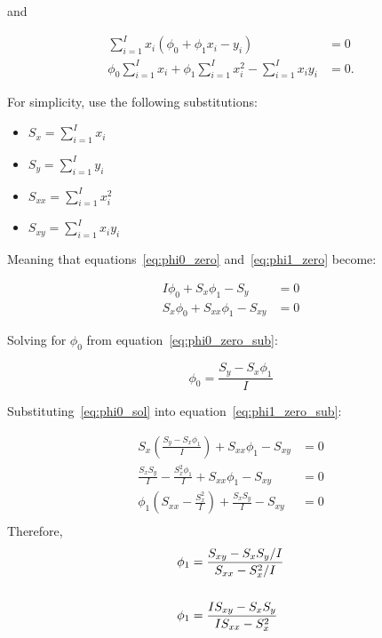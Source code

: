 \documentclass[12pt]{report}
\begin{document}
and

\begin{align}
    \sum_{i=1}^{I}x_{i}(\phi_{0} + \phi_{1}x_{i} - y_{i})                                    & = 0  \\
    \phi_{0}\sum_{i=1}^{I}x_{i} + \phi_{1}\sum_{i=1}^{I}x_{i}^{2} - \sum_{i=1}^{I}x_{i}y_{i} & = 0.
    \label{eq:phi1_zero}
\end{align}

For simplicity, use the following substitutions:

\begin{itemize}
    \item $S_{x} = \sum_{i=1}^{I}x_{i}$
    \item $S_{y} = \sum_{i=1}^{I}y_{i}$
    \item $S_{xx} = \sum_{i=1}^{I}x_{i}^{2}$
    \item $S_{xy} = \sum_{i=1}^{I}x_{i}y_{i}$
\end{itemize}

Meaning that equations~\eqref{eq:phi0_zero} and~\eqref{eq:phi1_zero} become:

\begin{align}
    I\phi_{0} + S_{x}\phi_{1} - S_{y}       & = 0
    \label{eq:phi0_zero_sub}                      \\
    S_{x}\phi_{0} + S_{xx}\phi_{1} - S_{xy} & = 0
    \label{eq:phi1_zero_sub}
\end{align}

Solving for $\phi_{0}$ from equation~\eqref{eq:phi0_zero_sub}:

\begin{equation}
    \phi_{0} = \frac{S_{y} - S_{x}\phi_{1}}{I}
    \label{eq:phi0_sol}
\end{equation}

Substituting~\eqref{eq:phi0_sol} into equation~\eqref{eq:phi1_zero_sub}:

\begin{align}
    S_{x}\left(\frac{S_{y} - S_{x}\phi_{1}}{I}\right) + S_{xx}\phi_{1} - S_{xy}       & = 0 \\
    \frac{S_{x}S_{y}}{I} - \frac{S_{x}^{2}\phi_{1}}{I} + S_{xx}\phi_{1} - S_{xy}      & = 0 \\
    \phi_{1}\left(S_{xx} - \frac{S_{x}^{2}}{I}\right) + \frac{S_{x}S_{y}}{I} - S_{xy} & = 0 \\
\end{align}
Therefore,
\begin{align}
    \phi_{1} & = \frac{S_{xy}-S_{x}S_{y}/I}{S_{xx}-S_{x}^{2}/I} \\
    \null\notag                                                 \\
    \phi_{1} & = \frac{IS_{xy}-S_{x}S_{y}}{IS_{xx}-S_{x}^{2}}
    \label{eq:phi1_sol}
\end{align}
\end{document}
